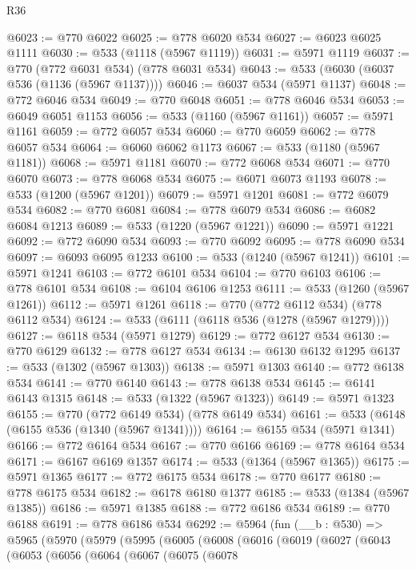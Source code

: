 \begin{lexlean}{R36}
\begin{coremodule}
@6023 := @770 @6022
@6025 := @778 @6020 @534
@6027 := @6023 @6025 @1111
@6030 := @533 (@1118 (@5967 @1119))
@6031 := @5971 @1119
@6037 := @770 (@772 @6031 @534) (@778 @6031 @534)
@6043 := @533 (@6030 (@6037 @536 (@1136 (@5967 @1137))))
@6046 := @6037 @534 (@5971 @1137)
@6048 := @772 @6046 @534
@6049 := @770 @6048
@6051 := @778 @6046 @534
@6053 := @6049 @6051 @1153
@6056 := @533 (@1160 (@5967 @1161))
@6057 := @5971 @1161
@6059 := @772 @6057 @534
@6060 := @770 @6059
@6062 := @778 @6057 @534
@6064 := @6060 @6062 @1173
@6067 := @533 (@1180 (@5967 @1181))
@6068 := @5971 @1181
@6070 := @772 @6068 @534
@6071 := @770 @6070
@6073 := @778 @6068 @534
@6075 := @6071 @6073 @1193
@6078 := @533 (@1200 (@5967 @1201))
@6079 := @5971 @1201
@6081 := @772 @6079 @534
@6082 := @770 @6081
@6084 := @778 @6079 @534
@6086 := @6082 @6084 @1213
@6089 := @533 (@1220 (@5967 @1221))
@6090 := @5971 @1221
@6092 := @772 @6090 @534
@6093 := @770 @6092
@6095 := @778 @6090 @534
@6097 := @6093 @6095 @1233
@6100 := @533 (@1240 (@5967 @1241))
@6101 := @5971 @1241
@6103 := @772 @6101 @534
@6104 := @770 @6103
@6106 := @778 @6101 @534
@6108 := @6104 @6106 @1253
@6111 := @533 (@1260 (@5967 @1261))
@6112 := @5971 @1261
@6118 := @770 (@772 @6112 @534) (@778 @6112 @534)
@6124 := @533 (@6111 (@6118 @536 (@1278 (@5967 @1279))))
@6127 := @6118 @534 (@5971 @1279)
@6129 := @772 @6127 @534
@6130 := @770 @6129
@6132 := @778 @6127 @534
@6134 := @6130 @6132 @1295
@6137 := @533 (@1302 (@5967 @1303))
@6138 := @5971 @1303
@6140 := @772 @6138 @534
@6141 := @770 @6140
@6143 := @778 @6138 @534
@6145 := @6141 @6143 @1315
@6148 := @533 (@1322 (@5967 @1323))
@6149 := @5971 @1323
@6155 := @770 (@772 @6149 @534) (@778 @6149 @534)
@6161 := @533 (@6148 (@6155 @536 (@1340 (@5967 @1341))))
@6164 := @6155 @534 (@5971 @1341)
@6166 := @772 @6164 @534
@6167 := @770 @6166
@6169 := @778 @6164 @534
@6171 := @6167 @6169 @1357
@6174 := @533 (@1364 (@5967 @1365))
@6175 := @5971 @1365
@6177 := @772 @6175 @534
@6178 := @770 @6177
@6180 := @778 @6175 @534
@6182 := @6178 @6180 @1377
@6185 := @533 (@1384 (@5967 @1385))
@6186 := @5971 @1385
@6188 := @772 @6186 @534
@6189 := @770 @6188
@6191 := @778 @6186 @534
@6292 := @5964
    (fun (__b : @530) =>
    @5965
      (@5970
        (@5979
          (@5995
            (@6005
              (@6008
                (@6016
                  (@6019
                    (@6027
                      (@6043
                        (@6053
                          (@6056
                            (@6064
                              (@6067
                                (@6075
                                  (@6078

\end{coremodule}
\end{lexlean}
